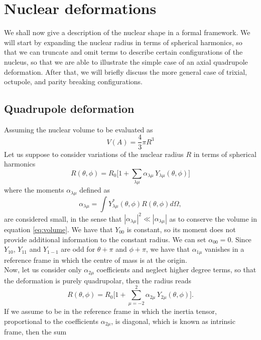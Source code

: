 \section{Nuclear deformations}
\label{sec:deformations}
We shall now give a description of the nuclear shape in a formal framework. We will start by expanding the nuclear radius in terms of spherical harmonics, so that we can truncate and omit terms to describe certain configurations of the nucleus, so that we are able to illustrate the simple case of an axial quadrupole deformation. After that, we will briefly discuss the more general case of trixial, octupole, and parity breaking configurations.
\subsection{Quadrupole deformation}
Assuming the nuclear volume to be evaluated as
\begin{equation}
    \label{eq:volume}
    V(A) = \frac{4}{3}\pi R^3
\end{equation}
Let us suppose to consider variations of the nuclear radius $R$ in terms of spherical harmonics
\begin{equation}
    R(\theta, \phi) = R_0\bigg[1+\sum_{\lambda \mu}\alpha_{\lambda \mu}\,Y_{\lambda\mu}(\theta,\phi)\bigg]
\end{equation}
where the moments $\alpha_{\lambda \mu}$ defined as
\begin{equation}
    \alpha_{\lambda \mu}=\int Y_{\lambda\mu}^*(\theta, \phi)R(\theta, \phi) d\Omega,
\end{equation}
are considered small, in the sense that $|\alpha_{\lambda \mu}| ^2 \ll |\alpha_{\lambda \mu}| $ as to conserve the volume in equation \eqref{eq:volume}. We have that $Y_{00}$ is constant, so its moment does not provide additional information to the constant radius. We can set $\alpha_{00}=0$. 
Since $Y_{10}$, $Y_{11}$ and $Y_{1-1}$ are odd for $\theta + \pi$ and $\phi + \pi$, we have that $\alpha_{1\mu}$ vanishes in a reference frame in which the centre of mass is at the origin.
\\Now, let us consider only $\alpha_{2\mu}$ coefficients and neglect higher degree terms, so that the deformation is purely quadrupolar, then the radius reads
\begin{equation}
    R(\theta, \phi) = R_0\bigg[1+\sum_{\mu=-2}^2\alpha_{2\mu}\,Y_{2\mu}(\theta, \phi)\bigg].
\end{equation}
If we assume to be in the reference frame in which the inertia tensor, proportional to the coefficients $\alpha_{2\mu}$, is diagonal, which is known as intrinsic frame, then the sum 
